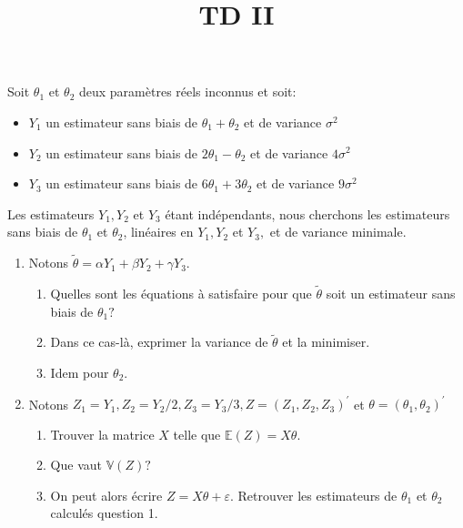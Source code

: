 \documentclass{td_um}
\title{TD II}
\providecommand{\1}{\mathds{1}}
\begin{document}
\maketitle


\exo{}  Soit $\theta_{1}$ et $\theta_{2}$ deux paramètres réels inconnus et soit:
\begin{itemize}
    \item    $Y_{1}$ un estimateur sans biais de $\theta_{1}+\theta_{2}$ et de variance $\sigma^{2}$
    \item    $Y_{2}$ un estimateur sans biais de $2 \theta_{1}-\theta_{2}$ et de variance $4 \sigma^{2}$ 
    \item    $Y_{3}$ un estimateur sans biais de $6 \theta_{1}+3 \theta_{2}$ et de variance $9 \sigma^{2}$ 
\end{itemize}
Les estimateurs $Y_{1}, Y_{2}$ et $Y_{3}$ étant indépendants, nous cherchons les estimateurs sans biais de $\theta_{1}$ et $\theta_{2}$, linéaires en $Y_{1}, Y_{2}$ et $Y_{3},$ et de variance minimale.
\begin{enumerate}
    \item Notons $\tilde{\theta}=\alpha Y_{1}+\beta Y_{2}+\gamma Y_{3}$.
        \begin{enumerate}
            \item Quelles sont les équations à satisfaire pour que $\tilde{\theta}$ soit un estimateur sans biais de $\theta_{1} ?$
            \item Dans ce cas-là, exprimer la variance de $\tilde{\theta}$ et la minimiser.
            \item Idem pour $\theta_{2}$.
        \end{enumerate}
            \item Notons $Z_{1}=Y_{1}, Z_{2}=Y_{2} / 2, Z_{3}=Y_{3} / 3, Z=\left(Z_{1}, Z_{2}, Z_{3}\right)^{\prime}$ et $\theta=\left(\theta_{1}, \theta_{2}\right)^{\prime}$
        \begin{enumerate}
    \item Trouver la matrice $X$ telle que $\mathbb{E}(Z)=X \theta$.
            \item Que vaut $\mathbb{V}(Z) ?$
            \item On peut alors écrire $Z=X \theta+\varepsilon .$ Retrouver les estimateurs de $\theta_{1}$ et $\theta_{2}$ calculés question 1.
    \end{enumerate}
\end{enumerate}

\cor{\newpage}
\end{document}
